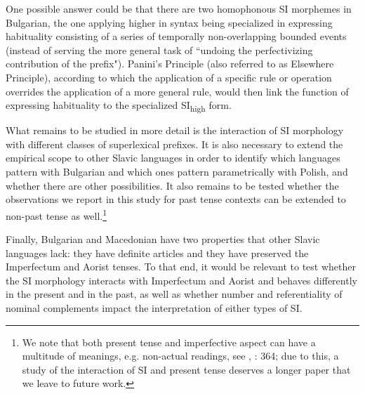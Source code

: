 \documentclass[output=paper,colorlinks,citecolor=brown]{langscibook}
\begin{document}
\noindent One possible answer could be that there are two homophonous SI morphemes in Bulgarian, the one applying higher in syntax being specialized in expressing habituality consisting of a series of temporally non-overlapping bounded events (instead of serving the more general task of ``undoing the perfectivizing contribution of the prefix"). Panini's Principle (also referred to as Elsewhere Principle), according to which the application of a specific rule or operation overrides the application of a more general rule, would then link the function of expressing habituality to the specialized SI\textsubscript{high} form.

What remains to be studied in more detail is the interaction of SI morphology with different classes of superlexical prefixes. It is also necessary to extend the empirical scope to other Slavic languages in order to identify which languages pattern with Bulgarian and which ones pattern parametrically with Polish, and whether there are other possibilities. It also remains to be tested whether the observations we report in this study for past tense contexts can be extended to non-past tense as well.\footnote{We note that both present tense and imperfective aspect can have a multitude of meanings, e.g. non-actual readings, see  \citet{rivero2014}, \citet{nicolova2017}: 364; due to this, a study of the interaction of SI and present tense deserves a longer paper that we leave to future work. } 

Finally,  Bulgarian and Macedonian have two properties that other Slavic languages lack: they have definite articles and they have preserved the Imperfectum and Aorist tenses. To that end, it would be relevant to test whether the SI morphology interacts with Imperfectum and Aorist and behaves differently in the present and in the past, as well as whether number and referentiality of nominal complements impact the interpretation of either types of SI.  






\end{document}
